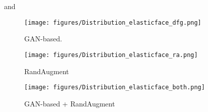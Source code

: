 \documentclass[10pt,twocolumn,letterpaper]{ieeeconf}
\begin{document}
   and


























\begin{figure*}[ht!]
	\centering
    \begin{subfigure}[b]{0.24\textwidth}
        \centering
        \texttt{[image: figures/Distribution\_elasticface\_dfg.png]}
        \caption{GAN-based.}
        \label{fig:DFG_distribution}
    \end{subfigure}
\begin{subfigure}[b]{0.24\textwidth}
        \centering
        \texttt{[image: figures/Distribution\_elasticface\_ra.png]}
        \caption{RandAugment}
        \label{fig:RA_distribution}
    \end{subfigure}
\begin{subfigure}[b]{0.24\textwidth}
        \centering
        \texttt{[image: figures/Distribution\_elasticface\_both.png]}
        \caption{GAN-based + RandAugment}
        \label{fig:DFG_RA_distribution}
    \end{subfigure}
    \vspace{-2mm}
	\caption{The genuine (blue) and imposter (orange) score distributions of three different data augmentation settings. The genuine pairs are constructed using GAN-based augmentation (Figure \ref{fig:DFG_distribution}), RandAugment (Figure \ref{fig:RA_distribution}), and GAN-based with RandAugment (Figure \ref{fig:DFG_RA_distribution}). The biggest effect is noticed when combining both augmentations.}
	\label{fig:identity_distributions}
	\vspace{-4mm}
\end{figure*}
\end{document}
